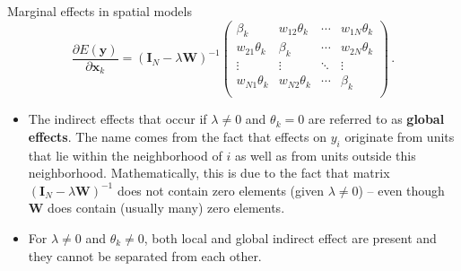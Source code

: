 \documentclass{beamer}
\begin{document}
\begin{frame}{Marginal effects in spatial models}
\begin{equation*}
\frac{\partial E(\bm{y})}{\partial \bm{x}_k}
    =(\bm{I}_N - \lambda \bm{W})^{-1}
	\begin{pmatrix}
		\beta_{k} & w_{12}\theta_{k}& \cdots & w_{1N}\theta_{k}\\
		w_{21}\theta_{k}& \beta_{k} & \cdots & w_{2N}\theta_{k}\\
		\vdots & \vdots & \ddots & \vdots \\
		w_{N1}\theta_{k} & w_{N2}\theta_{k} & \cdots & \beta_{k} \\
	\end{pmatrix}\,. 
\end{equation*}
\begin{itemize}
	\item The indirect effects that occur if $\lambda \neq 0$ and $\theta_k = 0$ are referred to as \textbf{global effects}. The name comes from the fact that effects on $y_i$ originate from units that lie within the neighborhood of $i$ as well as from units outside this neighborhood. Mathematically, this is due to the fact that matrix $(\bm{I}_N-\lambda \bm{W})^{-1}$ does not contain zero elements (given $\lambda \neq 0$) -- even though $\bm{W}$ does contain (usually many) zero elements.
	\medskip
    \item For $\lambda \neq 0$ and $\theta_k \neq 0$, both local and global indirect effect are present and they cannot be separated from each other.
\end{itemize}	
\end{frame}
\end{document}
